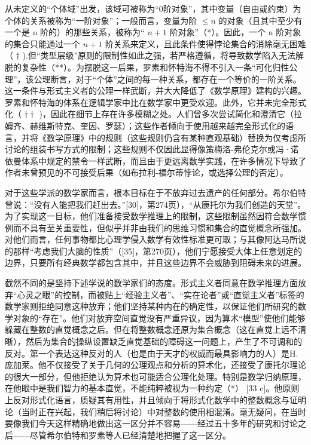 从未定义的“个体域”出发，该域可被称为“0阶对象”，其中变量（自由或约束）为个体的关系被称为“一阶对象”；一般而言，变量为阶 \(\leqslant n\) 的对象（且其中至少有一个是 n 阶的）的那些关系，被称为“ \(n + 1\) 阶对象”（*）。因此，一个 n 阶对象的集合只能通过一个 \(n + 1\) 阶关系来定义，且此条件使得悖论集合的消除毫无困难（ \(\dagger\) ).但“类型层级”原则的限制性如此之强，若严格遵循，将导致数学陷入无法解脱的复杂性（**）。为摆脱这一后果，罗素和怀特海不得不引入一条“可化归性公理”，该公理断言，对于“个体”之间的每一种关系，都存在一个等价的一阶关系。这一条件与形式主义者的公理一样武断，并大大降低了《数学原理》建构的兴趣。罗素和怀特海的体系在逻辑学家中比在数学家中更受欢迎。此外，它并未完全形式化（ \(\dagger\dagger\) )，因此在细节上存在许多模糊之处。人们曾多次尝试简化和澄清它（拉姆齐、赫维斯特克、奎因、罗瑟）；这些作者倾向于使用越来越完全形式化的语言，并将《数学原理》中的规则（这些规则仍含有某种直观基础）替换为仅考虑所讨论的组装书写方式的限制；这些规则不仅因此显得像策梅洛-弗伦克尔或冯·诺依曼体系中规定的禁令一样武断，而且由于更远离数学实践，在许多情况下导致了作者未曾预见的不可接受后果（如布拉利-福尔蒂悖论，或选择公理的否定）。

对于这些学派的数学家而言，根本目标在于不放弃过去遗产的任何部分。希尔伯特曾说：“没有人能把我们赶出去。”{[}30{]}，第274页），“从康托尔为我们创造的天堂”。为了实现这一目标，他们准备接受数学推理上的限制，这些限制虽然因符合数学惯例而不具有至关重要性，但似乎并非由我们的思维习惯和集合的直觉概念所强加。对他们而言，任何事物都比心理学侵入数学有效性标准更可取；与其像阿达马所说的那样“考虑我们大脑的性质”（{[}35{]}，第270页），他们宁愿接受大体上任意划定的边界，只要所有经典数学都包含其中，并且这些边界不会威胁到阻碍未来的进展。

截然不同的是坚持下述学说的数学家们的态度。形式主义者同意在数学推理方面放弃“心灵之眼”的控制，而被贴上“经验主义者”、“实在论者”或“直觉主义者”标签的数学家则拒绝同意这种放弃；他们坚持某种内在的确定性，以保证他们所研究的数学对象的“存在”。他们对放弃空间直觉没有严重异议，因为算术“模型”使他们能够躲藏在整数的直觉概念之后。但在将整数概念还原为集合概念（这在直觉上远不清晰），然后为集合的操纵设置缺乏直觉基础的障碍这一问题上，产生了不可调和的反对。第一个表达这种反对的人（也是由于天才的权威而最具影响力的人）是H.庞加莱。他不仅接受了关于几何的公理观点和分析的算术化，还接受了康托尔理论的很大一部分，但他拒绝认为算术也可能适合公理化处理。特别是数学归纳原理，在他眼中是我们智力的基本直觉，不能纯粹被视为一种约定（*） {[}33 c{]}。他原则上反对形式化语言，质疑其有用性，并且倾向于将形式化数学中的整数概念与证明论（当时正在兴起，我们稍后将讨论）中对整数的使用相混淆。毫无疑问，在当时要像我们今天这样精确地做出这一区分并不容易——经过五十多年的研究和讨论之后——尽管希尔伯特和罗素等人已经清楚地把握了这一区分。

